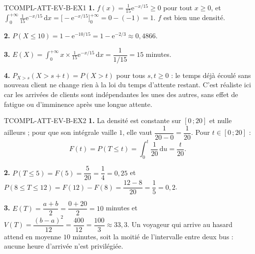 %
\begin{corrige}{TCOMPL-ATT-EV-B-EX1}
\textbf{1.} $f(x)=\frac{1}{15}\mathrm{e}^{-x/15}\geq0$ pour tout $x\geq0$, et $\displaystyle\int_0^{+\infty}\frac{1}{15}\mathrm{e}^{-x/15}\,\mathrm{d}x = \Big[-\mathrm{e}^{-x/15}\Big]_0^{+\infty} = 0-(-1)=1$. $f$ est bien une densité.

\textbf{2.} $P(X\leq10) = 1-\mathrm{e}^{-10/15} = 1-\mathrm{e}^{-2/3} \approx 0{,}4866$.

\textbf{3.} $E(X) = \displaystyle\int_0^{+\infty} x\times\frac{1}{15}\mathrm{e}^{-x/15}\,\mathrm{d}x = \dfrac{1}{1/15} = 15$ minutes.

\textbf{4.} $P_{X>s}(X>s+t) = P(X>t)$ pour tous $s,t\geq0$ : le temps déjà écoulé sans nouveau client ne change rien à la loi du temps d'attente restant. C'est réaliste ici car les arrivées de clients sont indépendantes les unes des autres, sans effet de \og fatigue \fg{} ou d'\og imminence \fg{} après une longue attente.
\end{corrige}

\begin{corrige}{TCOMPL-ATT-EV-B-EX2}
\textbf{1.} La densité est constante sur $[0\,;20]$ et nulle ailleurs ; pour que son intégrale vaille $1$, elle vaut $\dfrac{1}{20-0}=\dfrac1{20}$. Pour $t\in[0\,;20]$ :
\[
  F(t)=P(T\leq t)=\int_0^t \frac1{20}\,\mathrm{d}u=\frac{t}{20}.
\]

\textbf{2.} $P(T\leq5)=F(5)=\dfrac{5}{20}=\dfrac14=0{,}25$ et
$P(8\leq T\leq12)=F(12)-F(8)=\dfrac{12-8}{20}=\dfrac15=0{,}2$.

\textbf{3.} $E(T)=\dfrac{a+b}{2}=\dfrac{0+20}{2}=10$ minutes et
$V(T)=\dfrac{(b-a)^2}{12}=\dfrac{400}{12}=\dfrac{100}{3}\approx33{,}3$.
Un voyageur qui arrive au hasard attend en moyenne $10$ minutes, soit la moitié
de l'intervalle entre deux bus : aucune heure d'arrivée n'est privilégiée.
\end{corrige}
